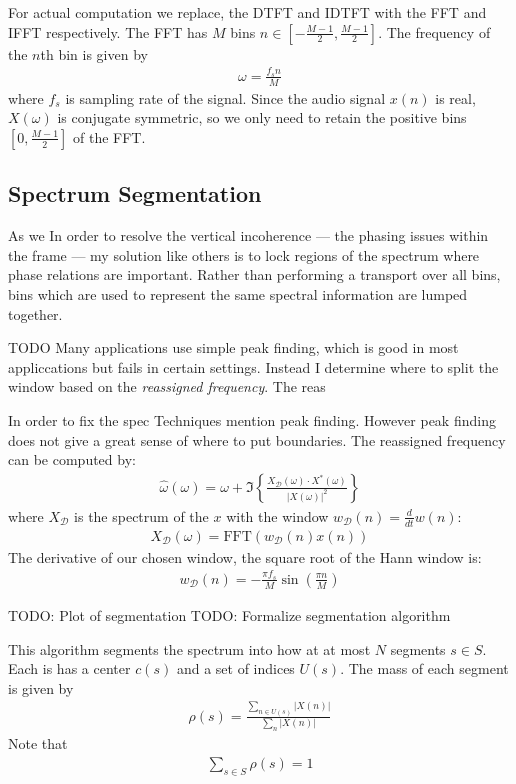 \documentclass[12pt]{article}
\newcommand{\fft}{\text{FFT}}
\begin{document}
For actual computation we replace, the DTFT and IDTFT with the FFT and IFFT respectively. 
The FFT has $M$ bins $n\in\left[-\frac{M - 1}{2}, \frac{M - 1}{2}\right]$.
The frequency of the $n$th bin is given by
\begin{align}
  \omega = \frac{f_s n}{M}
\end{align}
where $f_s$ is sampling rate of the signal.
Since the audio signal $x(n)$ is real, $X(\omega)$ is conjugate symmetric, so we only need to retain the positive bins $\left[0, \frac{M - 1}{2}\right]$ of the FFT.


\subsection{Spectrum Segmentation}

As we 
In order to resolve the vertical incoherence --- the phasing issues within the frame --- my solution like others is to lock regions of the spectrum where phase relations are important. Rather than performing a transport over all bins, bins which are used to represent the same spectral information are lumped together. 

TODO
Many applications use simple peak finding, which is good in most appliccations but fails in certain settings.
Instead I determine where to split the window based on the \emph{reassigned frequency}.
The reas


In order to fix the spec
Techniques mention peak finding.
However peak finding does not give a great sense of where to put boundaries. 
The reassigned frequency can be computed by:
\begin{align}
  \hat{\omega}(\omega) = 
  \omega + 
  \Im\left\{%
    \frac{X_\mathcal{D}(\omega)\cdot X^*(\omega)}{|X(\omega)|^2}
  \right\}
\end{align}
where $X_\mathcal{D}$ is the spectrum of the $x$ with the window
$w_\mathcal{D}(n) = \frac{d}{dt}w(n)$:
\begin{align}
  X_\mathcal{D}(\omega) = \fft\left(w_\mathcal{D}(n)x(n)\right)
\end{align}
The derivative of our chosen window, the square root of the Hann window is:
\begin{align}
   w_\mathcal{D}(n) = -\frac{\pi f_s}{M}\sin\left(\frac{\pi n}{M}\right)
\end{align}

TODO: Plot of segmentation
TODO: Formalize segmentation algorithm

This algorithm segments the spectrum into how at at most $N$ segments $s\in S$.
Each is has a center $c(s)$ and a set of indices $U(s)$.
The mass of each segment is given by 
\begin{align}
  \rho(s) = \frac{\sum_{n\in U(s)}|X(n)|}{\sum_{n}|X(n)|}
\end{align}
Note that
\begin{align}
  \sum_{s\in S} \rho(s) = 1
\end{align}
\end{document}
